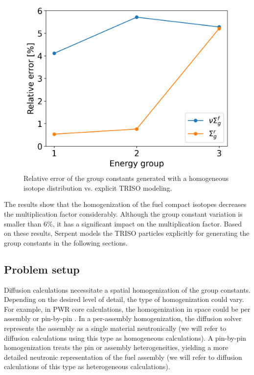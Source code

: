 \begin{figure}[htbp!]
	\centering
	\includegraphics[width=0.43\linewidth]{figures-neutronics/param-comparison}
	\hfill
	\caption{Relative error of the group constants generated with a homogeneous isotope distribution vs. explicit TRISO modeling.}
	\label{fig:param-comparison}
\end{figure}

The results show that the homogenization of the fuel compact isotopes decreases the multiplication factor considerably.
Although the group constant variation is smaller than 6\%, it has a significant impact on the multiplication factor.
Based on these results, Serpent models the TRISO particles explicitly for generating the group constants in the following sections.

\subsection{Problem setup}
\label{sec:setup}

Diffusion calculations necessitate a spatial homogenization of the group constants.
Depending on the desired level of detail, the type of homogenization could vary.
For example, in PWR core calculations, the homogenization in space could be per assembly or pin-by-pin \cite{krebs_calculational_1990}.
In a per-assembly homogenization, the diffusion solver represents the assembly as a single material neutronically (we will refer to diffusion calculations using this type as homogeneous calculations).
A pin-by-pin homogenization treats the pin or assembly heterogeneities, yielding a more detailed neutronic representation of the fuel assembly (we will refer to diffusion calculations of this type as heterogeneous calculations).

